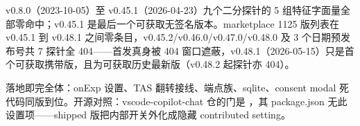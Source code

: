 v0.8.0（2023-10-05）至 v0.45.1（2026-04-23）九个二分探针的 5 组特征字面量全部零命中；v0.45.1 是最后一个可获取无签名版本。marketplace 1125 版列表在 v0.45.1 到 v0.48.1 之间零条目，v0.45.2/v0.46.0/v0.47.0/v0.48.0 及 3 个日期预发布号共 7 探针全 404——首发真身被 404 窗口遮蔽，v0.48.1（2026-05-15）只是首个可获取携带版，且为可获取历史最新版（v0.48.2 起探针亦 404）。

落地即完全体：onExp 设置、TAS 翻转接线、端点族、sqlite、consent modal 死代码同版到位。开源对照：vscode-copilot-chat 仓的门是 ，其 package.json 无此设置项——shipped 版把内部开关外化成隐藏 contributed setting。

